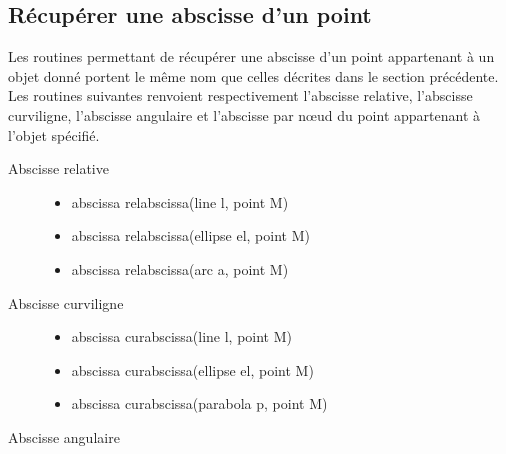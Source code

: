 \documentclass[pdftex]{article}
\begin{document}
\subsection{Récupérer une abscisse d'un point}
Les routines permettant de récupérer une abscisse d'un point
appartenant à un objet donné portent le même nom que celles décrites
dans le section précédente. Les routines suivantes renvoient
respectivement l'abscisse relative, l'abscisse curviligne, l'abscisse
angulaire et \og{}l'abscisse par n\oe{}ud\fg{} du
point  appartenant à l'objet spécifié.
\begin{description}
\item[Abscisse relative]\hspace*{0mm}
  \begin{itemize}
  \item {}
    \begin{Vcolor}
      abscissa relabscissa(line l, point M)
    \end{Vcolor}
  \item {}
    \begin{Vcolor}
      abscissa relabscissa(ellipse el, point M)
    \end{Vcolor}
  \item {}
    \begin{Vcolor}
      abscissa relabscissa(arc a, point M)
    \end{Vcolor}
  \end{itemize}
\item[Abscisse curviligne]\hspace*{0mm}
  \begin{itemize}
  \item {}
    \begin{Vcolor}
      abscissa curabscissa(line l, point M)
    \end{Vcolor}
  \item {}
    \begin{Vcolor}
      abscissa curabscissa(ellipse el, point M)
    \end{Vcolor}
  \item {}
    \begin{Vcolor}
      abscissa curabscissa(parabola p, point M)
    \end{Vcolor}
  \end{itemize}
\item [Abscisse angulaire]\hspace*{0mm}

\end{description}
\end{document}
